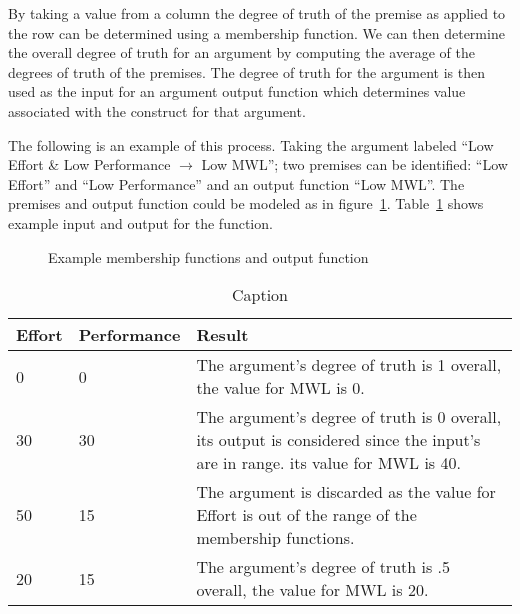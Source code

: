 By taking a value from a column the degree of truth of the premise as applied to the row can be determined using a membership function. We can then determine the overall degree of truth for an argument by computing the average of the degrees of truth of the premises. The degree of truth for the argument is then used as the input for an argument output function which determines value associated with the construct for that argument.

The following is an example of this process. Taking the argument labeled ``Low Effort \& Low Performance $\rightarrow$ Low MWL''; two premises can be identified: ``Low Effort'' and ``Low Performance'' and an output function ``Low MWL''. The premises and output function could be modeled as in figure~\ref{fig:membership_functions}. Table~\ref{tab:memfunc_ex} shows example input and output for the function. 


\begin{figure}
    \centering
    \hfill
    \caption{Example membership functions and output function}
    \label{fig:membership_functions}
\end{figure}

\begin{table}[]
\begin{center}
  \begin{tabular}{ | l | l | p{8cm} |}
    \hline 
Effort & Performance & Result \\ \hline
0 & 0 & The argument's degree of truth is 1 overall, the value for MWL is 0. \\
30 & 30 & The argument's degree of truth is 0 overall, its output is considered since the input's are in range. its value for MWL is 40. \\
50 & 15 & The argument is discarded as the value for Effort is out of the range of the membership functions. \\
20 & 15 & The argument's degree of truth is .5 overall, the value for MWL is 20. \\
    \hline
  \end{tabular}
\end{center}
\caption{Caption}
\label{tab:memfunc_ex}
\end{table}

